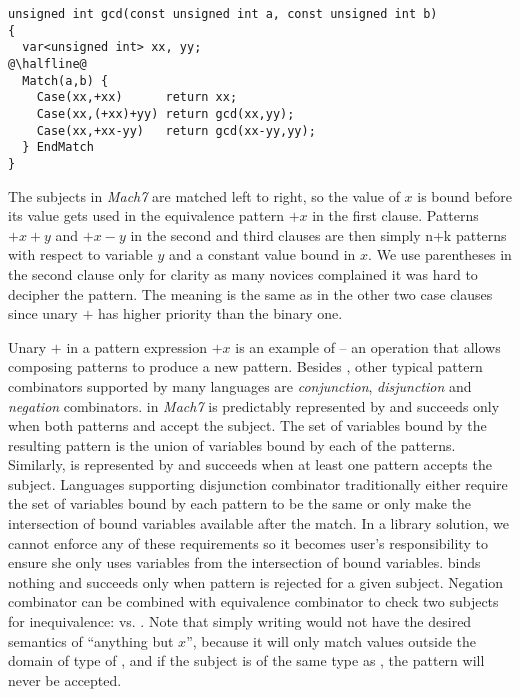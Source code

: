 \begin{lstlisting}[keepspaces,columns=flexible]
unsigned int gcd(const unsigned int a, const unsigned int b)
{
  var<unsigned int> xx, yy;
@\halfline@
  Match(a,b) {
    Case(xx,+xx)      return xx;
    Case(xx,(+xx)+yy) return gcd(xx,yy);
    Case(xx,+xx-yy)   return gcd(xx-yy,yy);
  } EndMatch
}
\end{lstlisting}

\noindent
The subjects in \emph{Mach7} are matched left to right, so the value of $x$ is 
bound before its value gets used in the equivalence pattern $+x$ in the first 
clause. Patterns $+x+y$ and $+x-y$ in the second and third clauses are then 
simply n+k patterns with respect to variable $y$ and a constant value bound in 
$x$. We use parentheses in the second clause only for clarity as many novices 
complained it was hard to decipher the pattern. The meaning is the same as in 
the other two case clauses since unary $+$ has higher priority than the binary 
one.

Unary $+$ in a pattern expression $+x$ is an example of  
-- an operation that allows composing patterns to produce a new pattern. 
Besides , other typical pattern combinators 
supported by many languages are \emph{conjunction}, \emph{disjunction} and 
\emph{negation} combinators.  in \emph{Mach7} is 
predictably represented by  and succeeds only when both patterns 
 and  accept the subject. The set of variables bound by the 
resulting pattern is the union of variables bound by each of the patterns. 
Similarly,  is represented by  and 
succeeds when at least one pattern accepts the subject. Languages supporting 
disjunction combinator traditionally either require the set of variables bound 
by each pattern to be the same or only make the intersection of bound variables 
available after the match. In a library solution, we cannot enforce any of these 
requirements so it becomes user's responsibility to ensure she only uses 
variables from the intersection of bound variables.  
 binds nothing and succeeds only when pattern  is rejected for 
a given subject. Negation combinator can be combined with equivalence combinator 
to check two subjects for inequivalence:  vs. . Note that 
simply writing  would not have the desired semantics of ``anything but 
$x$'', because it will only match values outside the domain of type of 
, and if the subject is of the same type as , the pattern 
 will never be accepted.

